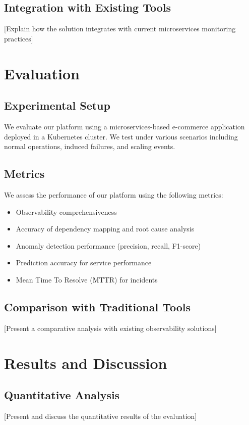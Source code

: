 \documentclass[10pt,journal,compsoc]{IEEEtran}
\begin{document}
\subsection{Integration with Existing Tools}
[Explain how the solution integrates with current microservices monitoring practices]

\section{Evaluation}
\subsection{Experimental Setup}
We evaluate our platform using a microservices-based e-commerce application deployed in a Kubernetes cluster. We test under various scenarios including normal operations, induced failures, and scaling events.

\subsection{Metrics}
We assess the performance of our platform using the following metrics:
\begin{itemize}
    \item Observability comprehensiveness
    \item Accuracy of dependency mapping and root cause analysis
    \item Anomaly detection performance (precision, recall, F1-score)
    \item Prediction accuracy for service performance
    \item Mean Time To Resolve (MTTR) for incidents
\end{itemize}

\subsection{Comparison with Traditional Tools}
[Present a comparative analysis with existing observability solutions]

\section{Results and Discussion}
\subsection{Quantitative Analysis}
[Present and discuss the quantitative results of the evaluation]
\end{document}

